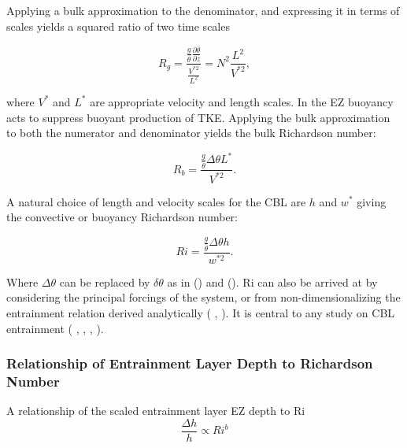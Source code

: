 Applying a bulk approximation to the denominator, and expressing it in terms of scales yields a squared ratio of two time scales

\begin{equation}
\label{eq:gradri}
R_{g} = \frac{\frac{g}{\overline{\theta}} \frac{\partial \overline{\theta}}{\partial z}}{\frac{V^{*2}}{L^{2}}} = N^{2}\frac{L^{2}}{V^{*2}},
\end{equation}

where $V^{*}$ and $L^{*}$ are appropriate velocity and length scales.  In the \acs{EZ} buoyancy acts to suppress buoyant production of \acs{TKE}. Applying the bulk approximation to both the numerator and denominator yields the bulk Richardson number:

\begin{equation}
R_{b} = \frac{\frac{g}{\overline{\theta}} \Delta \theta L^{*}}{V^{*2}}.
\end{equation}

A natural choice of length and velocity scales for the \acs{CBL} are $h$ and $w^{*}$ giving the convective or buoyancy Richardson number:

\begin{equation}
Ri = \frac{\frac{g}{\overline{\theta}} \Delta \theta h}{w^{*2}}.
\end{equation}

Where $\Delta \theta$ can be replaced by $\delta \theta$ as in \citeauthor{FedConzMir04} (\citeyear{FedConzMir04}) and \citeauthor{GarciaMellado} (\citeyear{GarciaMellado}).  \acs{Ri} can also be arrived at by considering the principal forcings of the system, or from non-dimensionalizing the entrainment relation  derived analytically (\citeauthor{Tennekes73}  \citeyear{Tennekes73}, \citeauthor{Deardorff72} \citeyear{Deardorff72}). It is central to any study on \acs{CBL} entrainment (\citeauthor{SullMoengStev} \citeyear{SullMoengStev}, \citeauthor{FedConzMir04} \citeyear{FedConzMir04}, \citeauthor{Traum11} \citeyear{Traum11}, \citeauthor{BrooksFowler2} \citeyear{BrooksFowler2}).


\subsubsection{Relationship of Entrainment Layer Depth to Richardson Number}

A relationship of the scaled entrainment layer \acs{EZ} depth to \acs{Ri}
\begin{equation}\label{eq:dhvsri}
\frac{\Delta h}{h} \propto Ri ^{b}
\end{equation}

